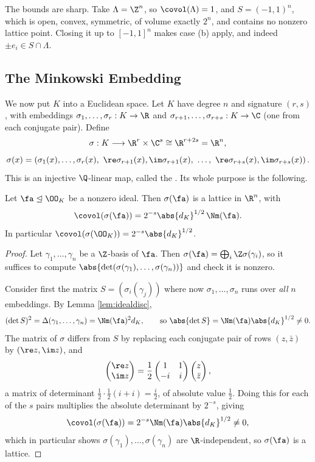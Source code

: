 \begin{remark}
	The bounds are sharp. Take $\Lambda = \Z^n$, so $\covol(\Lambda) = 1$, and $S = (-1,1)^n$, which is open, convex, symmetric, of volume exactly $2^n$, and contains no nonzero lattice point. Closing it up to $[-1,1]^n$ makes case (b) apply, and indeed $\pm e_i \in S\cap\Lambda$.
\end{remark}

\subsection{The Minkowski Embedding}

We now put $K$ into a Euclidean space. Let $K$ have degree $n$ and signature $(r,s)$, with embeddings $\sigma_1,\dots,\sigma_r : K \to \R$ and $\sigma_{r+1},\dots,\sigma_{r+s} : K \to \C$ (one from each conjugate pair). Define
$$\sigma : K \longrightarrow \R^r\times\C^s \cong \R^{r+2s} = \R^n,$$
$$\sigma(x) = \left(\sigma_1(x),\dots,\sigma_r(x),\ \re\sigma_{r+1}(x),\im\sigma_{r+1}(x),\ \dots,\ \re\sigma_{r+s}(x),\im\sigma_{r+s}(x)\right).$$
This is an injective $\Q$-linear map, called the . Its whole purpose is the following.

\begin{lemma}\label{lem:latticecovol}
	Let $\fa \trianglelefteq \OO_K$ be a nonzero ideal. Then $\sigma(\fa)$ is a lattice in $\R^n$, with
	$$\covol(\sigma(\fa)) = 2^{-s}\abs{d_K}^{1/2}\,\Nm(\fa).$$
	In particular $\covol(\sigma(\OO_K)) = 2^{-s}\abs{d_K}^{1/2}$.
\end{lemma}

\begin{proof}
	Let $\gamma_1,\dots,\gamma_n$ be a $\Z$-basis of $\fa$. Then $\sigma(\fa) = \bigoplus_i\Z\sigma(\gamma_i)$, so it suffices to compute $\abs{\det(\sigma(\gamma_1),\dots,\sigma(\gamma_n))}$ and check it is nonzero.

	Consider first the matrix $S = (\sigma_i(\gamma_j))$ where now $\sigma_1,\dots,\sigma_n$ runs over \emph{all} $n$ embeddings. By Lemma \ref{lem:idealdisc},
	$$(\det S)^2 = \Delta(\gamma_1,\dots,\gamma_n) = \Nm(\fa)^2 d_K, \qquad \text{so } \abs{\det S} = \Nm(\fa)\abs{d_K}^{1/2} \neq 0.$$
	The matrix of $\sigma$ differs from $S$ by replacing each conjugate pair of rows $(z, \bar z)$ by $(\re z, \im z)$, and
	$$\begin{pmatrix}\re z\\ \im z\end{pmatrix} = \frac12\begin{pmatrix}1 & 1\\ -i & i\end{pmatrix}\begin{pmatrix}z \\ \bar z\end{pmatrix},$$
	a matrix of determinant $\tfrac12 \cdot \tfrac{1}{2}(i+i)= \tfrac{i}{2}$, of absolute value $\tfrac12$. Doing this for each of the $s$ pairs multiplies the absolute determinant by $2^{-s}$, giving
	$$\covol(\sigma(\fa)) = 2^{-s}\Nm(\fa)\abs{d_K}^{1/2} \neq 0,$$
	which in particular shows $\sigma(\gamma_1),\dots,\sigma(\gamma_n)$ are $\R$-independent, so $\sigma(\fa)$ is a lattice.
\end{proof}


